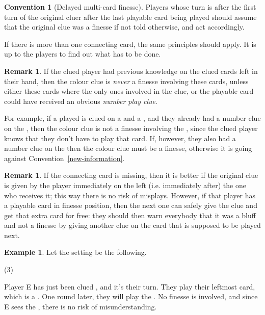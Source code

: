 \documentclass[a4paper]{article}
\theoremstyle{plain}
\theoremstyle{definition}
\newtheorem{remark}[theorem]{Remark}
\newtheorem{example}[theorem]{Example}
\newtheorem{convention}[theorem]{Convention}
\begin{document}
\begin{convention}[Delayed multi-card finesse]
	Players whose turn is after the first turn of the original cluer after the last playable card being played should assume that the original clue was a finesse if not told otherwise, and act accordingly.
	
	If there is more than one connecting card, the same principles should apply. It is up to the players to find out what has to be done.
\end{convention}

\begin{remark}
	If the clued player had previous knowledge on the clued cards left in their hand, then the colour clue is \textit{never} a finesse involving these cards, unless either these cards where the only ones involved in the clue, or the playable card could have received an obvious \textit{number play clue}.
\end{remark}

For example, if a played is clued on a  and a , and they already had a number clue on the , then the colour clue is not a finesse involving the , since the clued player knows that they don't have to play that card. If, however, they also had a number clue on the  then the colour clue must be a finesse, otherwise it is going against Convention~\ref{new-information}.

\begin{remark}
	If the connecting card is missing, then it is better if the original clue is given by the player immediately on the left (i.e. immediately after) the one who receives it; this way there is no risk of misplays. However, if that player has a playable card in finesse position, then the next one can safely give the clue and get that extra card for free: they should then warn everybody that it was a bluff and not a finesse by giving another clue on the card that is supposed to be played next.
\end{remark}

\begin{example}
	
	Let the setting be the following.
	
	\begin{tasks}(3)
		\task[+]      
		\task[A]    
		\task[B]    
		\task[C]    
		\task[D]    
		\task[E]    
	\end{tasks}
	
	Player E has just been clued , and it's their turn. They play their leftmost card, which is a . One round later, they will play the . No finesse is involved, and since E sees the , there is no risk of misunderstanding.
	
\end{example}
\end{document}
